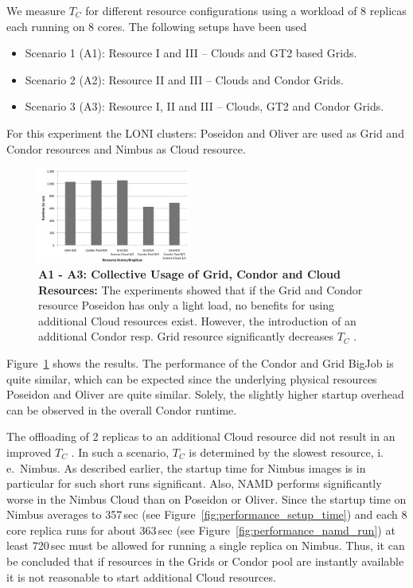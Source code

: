 \documentclass[conference,final]{IEEEtran}
\newcommand{\tc}{$T_{C}$ }
\begin{document}
We measure \tc for different resource configurations using a workload
of 8 replicas each running on 8 cores. The following setups have been used
\begin{itemize}
\item Scenario 1 (A1): Resource I and III -- Clouds and GT2 based Grids. 
\item Scenario 2 (A2): Resource II and III -- Clouds and Condor Grids.
\item Scenario 3 (A3): Resource I, II and III -- Clouds, GT2 and Condor Grids.
\end{itemize} 
For this experiment the LONI clusters: Poseidon and Oliver are used as Grid and Condor resources and
Nimbus as Cloud resource.

\begin{figure}[htbp]
    \centering
        \includegraphics[width=0.45\textwidth]{performance/8replica_scenario_grid_condor_cloud}
        \caption{\textbf{A1 - A3: Collective Usage of Grid, Condor and
            Cloud Resources: } The experiments showed that if the Grid
          and Condor resource Poseidon has only a light load, no
          benefits for using additional Cloud resources
          exist. However, the introduction of an additional Condor
          resp. Grid resource significantly decreases \tc.}
    \label{fig:performance_8replica_grid_cloud_condor}
\end{figure}

Figure~\ref{fig:performance_8replica_grid_cloud_condor} shows the results. The performance of the Condor and
Grid BigJob is quite similar, which can be expected since the underlying physical resources Poseidon and Oliver
are quite similar. Solely, the slightly higher startup overhead can be observed in the overall Condor
runtime.

The offloading of 2 replicas to an additional Cloud resource did not
result in an improved \tc. In such a scenario, \tc is determined by
the slowest resource, i.\,e.\ Nimbus. As described earlier, the
startup time for Nimbus images is in particular for such short runs
significant. Also, NAMD performs significantly worse in the Nimbus
Cloud than on Poseidon or Oliver. Since the startup time on Nimbus
averages to 357\,sec (see Figure~\ref{fig:performance_setup_time}) and
each 8 core replica runs for about 363\,sec (see
Figure~\ref{fig:performance_namd_run}) at least 720\,sec must be
allowed for running a single replica on Nimbus. Thus, it can be
concluded that if resources in the Grids or Condor pool are instantly
available it is not reasonable to start additional Cloud resources.
\end{document}
